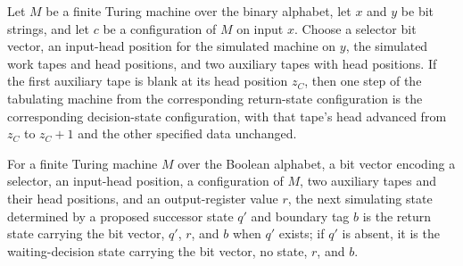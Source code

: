 \begin{theorem}
\label{Complexity.Meyer.ret_none}
\leanok
{}
Let $M$ be a finite Turing machine over the binary alphabet, let $x$ and $y$ be bit
strings, and let $c$ be a configuration of $M$ on input $x$. Choose a selector bit
vector, an input-head position for the simulated machine on $y$, the simulated work
tapes and head positions, and two auxiliary tapes with head positions. If the first
auxiliary tape is blank at its head position $z_C$, then one step of the tabulating
machine from the corresponding return-state configuration is the corresponding
decision-state configuration, with that tape's head advanced from $z_C$ to $z_C+1$ and
the other specified data unchanged.
\end{theorem}

\begin{definition}
\label{Complexity.Meyer.fireNext}
\leanok
{}
For a finite Turing machine $M$ over the Boolean alphabet, a bit vector encoding a
selector, an input-head position, a configuration of $M$, two auxiliary tapes and their
head positions, and an output-register value $r$, the next simulating state determined
by a proposed successor state $q'$ and boundary tag $b$ is the return state carrying the
bit vector, $q'$, $r$, and $b$ when $q'$ exists; if $q'$ is absent, it is the
waiting-decision state carrying the bit vector, no state, $r$, and $b$.
\end{definition}

